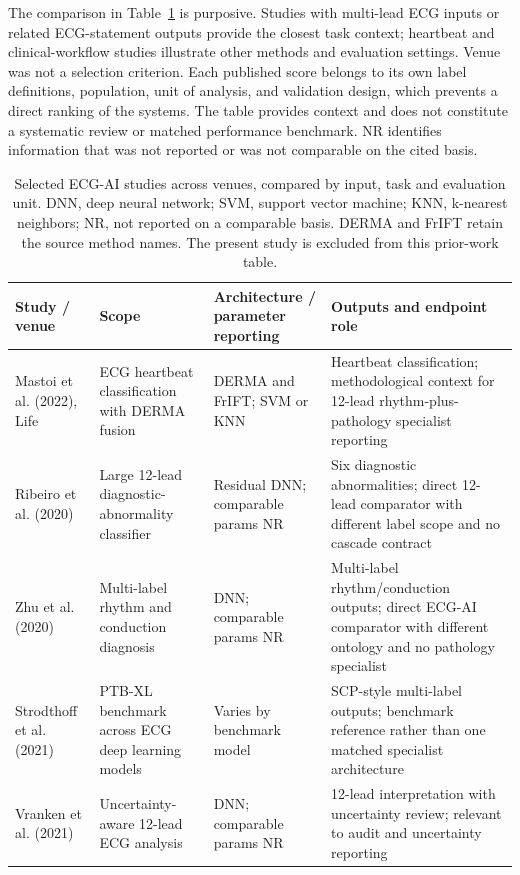 \documentclass[life,article,submit,moreauthors]{Definitions/mdpi}
\begin{document}
The comparison in Table~\ref{tab:comparison} is purposive. Studies with multi-lead ECG inputs or related ECG-statement outputs provide the closest task context; heartbeat and clinical-workflow studies illustrate other methods and evaluation settings. Venue was not a selection criterion. Each published score belongs to its own label definitions, population, unit of analysis, and validation design, which prevents a direct ranking of the systems. The table provides context and does not constitute a systematic review or matched performance benchmark. NR identifies information that was not reported or was not comparable on the cited basis.

\begin{table}[htbp]
\caption{Selected ECG-AI studies across venues, compared by input, task and evaluation unit. DNN, deep neural network; SVM, support vector machine; KNN, k-nearest neighbors; NR, not reported on a comparable basis. DERMA and FrIFT retain the source method names. The present study is excluded from this prior-work table.\label{tab:comparison}}
\centering
\footnotesize
\begin{tabular}{@{}p{}p{}p{}p{}@{}}
\toprule
\textbf{Study / venue} & \textbf{Scope} & \textbf{Architecture / parameter reporting} & \textbf{Outputs and endpoint role} \\
\midrule
Mastoi et al. (2022), Life & ECG heartbeat classification with DERMA fusion & DERMA and FrIFT; SVM or KNN & Heartbeat classification; methodological context for 12-lead rhythm-plus-pathology specialist reporting \\
Ribeiro et al. (2020) & Large 12-lead diagnostic-abnormality classifier & Residual DNN; comparable params NR & Six diagnostic abnormalities; direct 12-lead comparator with different label scope and no cascade contract \\
Zhu et al. (2020) & Multi-label rhythm and conduction diagnosis & DNN; comparable params NR & Multi-label rhythm/conduction outputs; direct ECG-AI comparator with different ontology and no pathology specialist \\
Strodthoff et al. (2021) & PTB-XL benchmark across ECG deep learning models & Varies by benchmark model & SCP-style multi-label outputs; benchmark reference rather than one matched specialist architecture \\
Vranken et al. (2021) & Uncertainty-aware 12-lead ECG analysis & DNN; comparable params NR & 12-lead interpretation with uncertainty review; relevant to audit and uncertainty reporting \\

\end{tabular}
\end{table}
\end{document}
